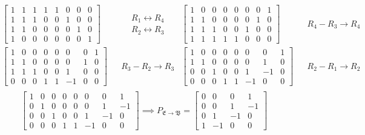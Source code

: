 \documentclass{report}
\begin{document}
\begin{align*}
	&\left[\begin{array}{cccc|cccc}
		1 & 1 & 1 & 1 & 1 & 0 & 0 & 0 \\
		1 & 1 & 1 & 0 & 0 & 1 & 0 & 0 \\
		1 & 1 & 0 & 0 & 0 & 0 & 1 & 0 \\
		1 & 0 & 0 & 0 & 0 & 0 & 0 & 1
	\end{array}\right]
	&& \begin{aligned} & R_1 \leftrightarrow R_4 \\ & R_2 \leftrightarrow R_3 \end{aligned}
	&\left[\begin{array}{cccc|cccc}
		1 & 0 & 0 & 0 & 0 & 0 & 0 & 1 \\
		1 & 1 & 0 & 0 & 0 & 0 & 1 & 0 \\
		1 & 1 & 1 & 0 & 0 & 1 & 0 & 0 \\
		1 & 1 & 1 & 1 & 1 & 0 & 0 & 0
	\end{array}\right]
	&& R_4 - R_3 \rightarrow R_4 \\
	&\left[\begin{array}{cccc|cccc}
		1 & 0 & 0 & 0 & 0 & 0 & 0 & 1 \\
		1 & 1 & 0 & 0 & 0 & 0 & 1 & 0 \\
		1 & 1 & 1 & 0 & 0 & 1 & 0 & 0 \\
		0 & 0 & 0 & 1 & 1 & -1 & 0 & 0
	\end{array}\right]
	&& R_3 - R_2 \rightarrow R_3
	&\left[\begin{array}{cccc|cccc}
		1 & 0 & 0 & 0 & 0 & 0 & 0 & 1 \\
		1 & 1 & 0 & 0 & 0 & 0 & 1 & 0 \\
		0 & 0 & 1 & 0 & 0 & 1 & -1 & 0 \\
		0 & 0 & 0 & 1 & 1 & -1 & 0 & 0
	\end{array}\right]
	&& R_2 - R_1 \rightarrow R_2 \\
\end{align*}
\[
	\left[\begin{array}{cccc|cccc}
		1 & 0 & 0 & 0 & 0 & 0 & 0 & 1 \\
		0 & 1 & 0 & 0 & 0 & 0 & 1 & -1 \\
		0 & 0 & 1 & 0 & 0 & 1 & -1 & 0 \\
		0 & 0 & 0 & 1 & 1 & -1 & 0 & 0
	\end{array}\right]
	\implies P_{\mathfrak{E}\rightarrow\mathfrak{B}} = \begin{bmatrix} 0 & 0 & 0 & 1 \\ 0 & 0 & 1 & -1 \\ 0 & 1 & -1 & 0 \\ 1 & -1 & 0 & 0\end{bmatrix}
\]\\
\end{document}

